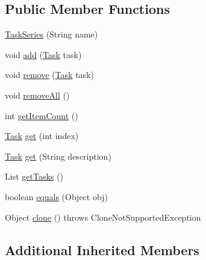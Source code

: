 \subsection*{Public Member Functions}
\begin{DoxyCompactItemize}
\item 
\mbox{\hyperlink{classorg_1_1jfree_1_1data_1_1gantt_1_1_task_series_a65754ab6d0f03cf8b367a6b401678137}{Task\+Series}} (String name)
\item 
void \mbox{\hyperlink{classorg_1_1jfree_1_1data_1_1gantt_1_1_task_series_a10d6000137c485fb4927ee63ef413755}{add}} (\mbox{\hyperlink{classorg_1_1jfree_1_1data_1_1gantt_1_1_task}{Task}} task)
\item 
void \mbox{\hyperlink{classorg_1_1jfree_1_1data_1_1gantt_1_1_task_series_a47dc6e33b99cdf3ea0e29b6b81b776c1}{remove}} (\mbox{\hyperlink{classorg_1_1jfree_1_1data_1_1gantt_1_1_task}{Task}} task)
\item 
void \mbox{\hyperlink{classorg_1_1jfree_1_1data_1_1gantt_1_1_task_series_a5a5d9fc7998c638af9a4643cbd6712d8}{remove\+All}} ()
\item 
int \mbox{\hyperlink{classorg_1_1jfree_1_1data_1_1gantt_1_1_task_series_a945c8e01970738e46ef5b146f9a643b7}{get\+Item\+Count}} ()
\item 
\mbox{\hyperlink{classorg_1_1jfree_1_1data_1_1gantt_1_1_task}{Task}} \mbox{\hyperlink{classorg_1_1jfree_1_1data_1_1gantt_1_1_task_series_a2c6624b3d87e494c065686258dc6af0c}{get}} (int index)
\item 
\mbox{\hyperlink{classorg_1_1jfree_1_1data_1_1gantt_1_1_task}{Task}} \mbox{\hyperlink{classorg_1_1jfree_1_1data_1_1gantt_1_1_task_series_a67bcf4b0e29966afc508ecfa2a400266}{get}} (String description)
\item 
List \mbox{\hyperlink{classorg_1_1jfree_1_1data_1_1gantt_1_1_task_series_a279591f041f643f647030eb7a016b157}{get\+Tasks}} ()
\item 
boolean \mbox{\hyperlink{classorg_1_1jfree_1_1data_1_1gantt_1_1_task_series_a03ac091eaa08cd9eed725ba44994b098}{equals}} (Object obj)
\item 
Object \mbox{\hyperlink{classorg_1_1jfree_1_1data_1_1gantt_1_1_task_series_ad43cc33a46ebc7d3cec87d408e2041f3}{clone}} ()  throws Clone\+Not\+Supported\+Exception 
\end{DoxyCompactItemize}
\subsection*{Additional Inherited Members}



